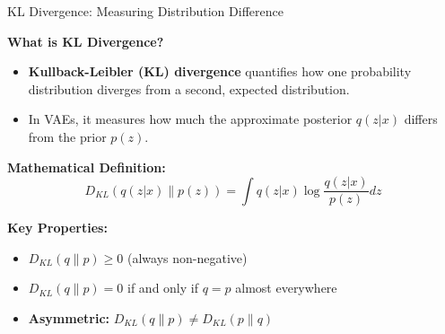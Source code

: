 \documentclass[5pt,aspectratio=169]{beamer}
\begin{document}
\begin{frame}{KL Divergence: Measuring Distribution Difference}

\textbf{What is KL Divergence?}
\begin{itemize}
    \item \textbf{Kullback-Leibler (KL) divergence} quantifies how one probability distribution diverges from a second, expected distribution.
    \item In VAEs, it measures how much the approximate posterior $q(z|x)$ differs from the prior $p(z)$.
\end{itemize}

\vspace{2mm}
\textbf{Mathematical Definition:}
\[
D_{KL}(q(z|x) \| p(z)) = \int q(z|x) \log \frac{q(z|x)}{p(z)} dz
\]

\vspace{2mm}
\textbf{Key Properties:}
\begin{itemize}
    \item $D_{KL}(q \| p) \geq 0$ (always non-negative)
    \item $D_{KL}(q \| p) = 0$ if and only if $q = p$ almost everywhere
    \item \textbf{Asymmetric:} $D_{KL}(q \| p) \neq D_{KL}(p \| q)$
\end{itemize}



\end{frame}
\end{document}
